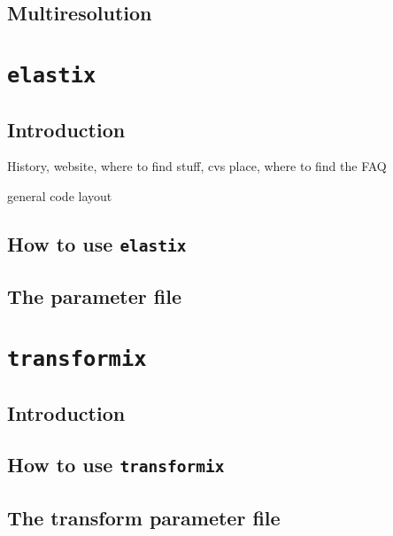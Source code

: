 \documentclass[]{report}
\newcommand{\elastix}{\texttt{elastix}}
\newcommand{\transformix}{\texttt{transformix}}
\begin{document}
\section{Multiresolution}


\chapter{\elastix}

\section{Introduction}

History, website, where to find stuff, cvs place, where to find the
FAQ

general code layout

\section{How to use \elastix}

\section{The parameter file}


\chapter{\transformix}

\section{Introduction}

\section{How to use \transformix}

\section{The transform parameter file}

\end{document}

